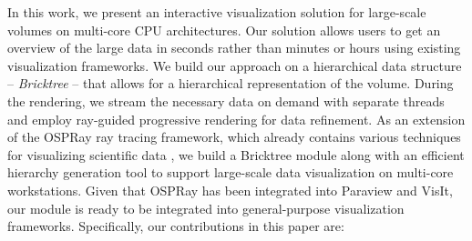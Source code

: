 



In this work, we present an interactive visualization solution for large-scale
volumes on multi-core CPU architectures. Our solution allows users to get an overview of the large
data in seconds rather than minutes or hours using existing visualization frameworks. 
We build our approach on a hierarchical data structure -- \textit{Bricktree} -- that allows
for a hierarchical representation of the volume. During the rendering, we stream the
necessary data on demand with separate threads and employ ray-guided progressive
rendering for data refinement. As an extension of the OSPRay ray tracing 
framework, which already contains various techniques for visualizing scientific data \cite{wald2017ospray,wang2019cpu,han_ray_2019}, we build a Bricktree
module along with an efficient hierarchy generation tool to support large-scale data
visualization on multi-core workstations. Given that OSPRay has been integrated into
Paraview and VisIt, our module is ready to be integrated into general-purpose
visualization frameworks. Specifically, our contributions in this paper are:

